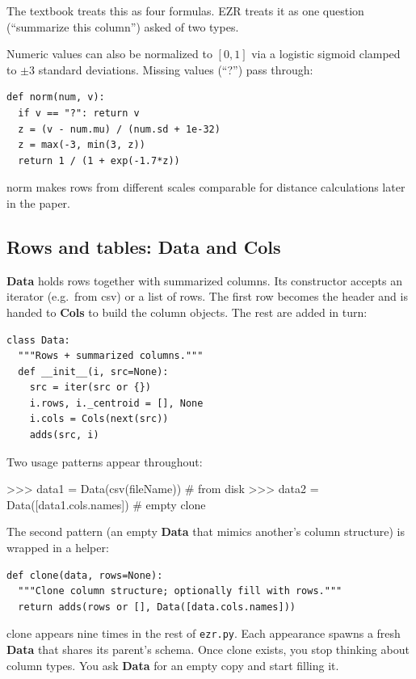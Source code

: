 \documentclass[AMA,STIX2COL]{WileyNJDv5}
\newcommand{\IT}{{\sffamily EZR}}
\newcommand{\cls}[1]{%
  \setlength{\fboxsep}{1.5pt}%
  \colorbox{clsbg}{\sffamily\bfseries{#1}}%
}
\begin{document}
The textbook treats this as four formulas. \IT{} treats it as
one question (``summarize this column'') asked of two types.

Numeric values can also be normalized to $[0,1]$ via a logistic
sigmoid clamped to $\pm3$ standard deviations. Missing values
(``?'') pass through:

\begin{verbatim}
def norm(num, v):
  if v == "?": return v
  z = (v - num.mu) / (num.sd + 1e-32)
  z = max(-3, min(3, z))
  return 1 / (1 + exp(-1.7*z))
\end{verbatim}

\textsf{norm} makes rows from different scales comparable for
distance calculations later in the paper.

\subsection{Rows and tables: \cls{Data} and \cls{Cols}}

\cls{Data} holds rows together with summarized columns. Its
constructor accepts an iterator (e.g.\ from \textsf{csv}) or a
list of rows. The first row becomes the header and is handed
to \cls{Cols} to build the column objects. The rest are added
in turn:

\begin{verbatim}
class Data:
  """Rows + summarized columns."""
  def __init__(i, src=None):
    src = iter(src or {})
    i.rows, i._centroid = [], None
    i.cols = Cols(next(src))
    adds(src, i)
\end{verbatim}

Two usage patterns appear throughout:

\begin{repl}
>>> data1 = Data(csv(fileName))           # from disk
>>> data2 = Data([data1.cols.names])      # empty clone
\end{repl}

The second pattern (an empty \cls{Data} that mimics another's
column structure) is wrapped in a helper:

\begin{verbatim}
def clone(data, rows=None):
  """Clone column structure; optionally fill with rows."""
  return adds(rows or [], Data([data.cols.names]))
\end{verbatim}

\textsf{clone} appears nine times in the rest of
\texttt{ezr.py}. Each appearance spawns a fresh \cls{Data} that
shares its parent's schema. Once \textsf{clone} exists, you
stop thinking about column types. You ask \cls{Data} for an
empty copy and start filling it.
\end{document}
